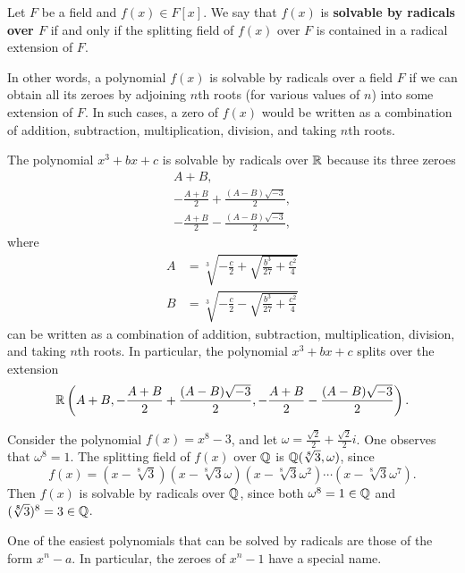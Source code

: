 \begin{definition}
    Let $F$ be a field and $f(x) \in F[x]$. We say that $f(x)$ is \textbf{solvable by radicals over $F$} if and only if the splitting field of $f(x)$ over $F$ is contained in a radical extension of $F$.
\end{definition}

In other words, a polynomial $f(x)$ is solvable by radicals over a field $F$ if we can obtain all its zeroes by adjoining $n$th roots (for various values of $n$) into some extension of $F$. In such cases, a zero of $f(x)$ would be written as a combination of addition, subtraction, multiplication, division, and taking $n$th roots.

\begin{example}\label{example-depressed-cubic-formula}
    The polynomial $x^3 + bx + c$ is solvable by radicals over $\mathbb{R}$ because its three zeroes
    \begin{gather*}
        A+B,\\
        -\frac{A+B}2 + \frac{(A-B)\sqrt{-3}}{2},\\
        -\frac{A+B}2 - \frac{(A-B)\sqrt{-3}}{2},
    \end{gather*}
    where
    \begin{align*}
        A &= \sqrt[3]{-\frac c2 + \sqrt{\frac{b^3}{27} + \frac{c^2}4}}\\
        B &= \sqrt[3]{-\frac c2 - \sqrt{\frac{b^3}{27} + \frac{c^2}4}}
    \end{align*}
    can be written as a combination of addition, subtraction, multiplication, division, and taking $n$th roots. In particular, the polynomial $x^3 + bx + c$ splits over the extension
    \[
        \mathbb{R}\left(A+B, -\frac{A+B}2 + \frac{(A-B)\sqrt{-3}}{2}, -\frac{A+B}2 - \frac{(A-B)\sqrt{-3}}{2}\right).
    \]
\end{example}

\begin{example}
    Consider the polynomial $f(x) = x^8 - 3$, and let $\omega = \frac{\sqrt2}{2} + \frac{\sqrt2}{2}i$. One observes that $\omega^8 = 1$. The splitting field of $f(x)$ over $\mathbb{Q}$ is $\mathbb{Q}(\sqrt[8]3, \omega)$, since
    \[
        f(x) = (x-\sqrt[8]3)(x-\sqrt[8]3\omega)(x-\sqrt[8]3\omega^2)\cdots(x-\sqrt[8]3\omega^7).
    \]
    Then $f(x)$ is solvable by radicals over $\mathbb{Q}$, since both $\omega^8 = 1 \in \mathbb{Q}$ and $(\sqrt[8]3)^8 = 3 \in \mathbb{Q}$.
\end{example}

One of the easiest polynomials that can be solved by radicals are those of the form $x^n - a$. In particular, the zeroes of $x^n - 1$ have a special name.

